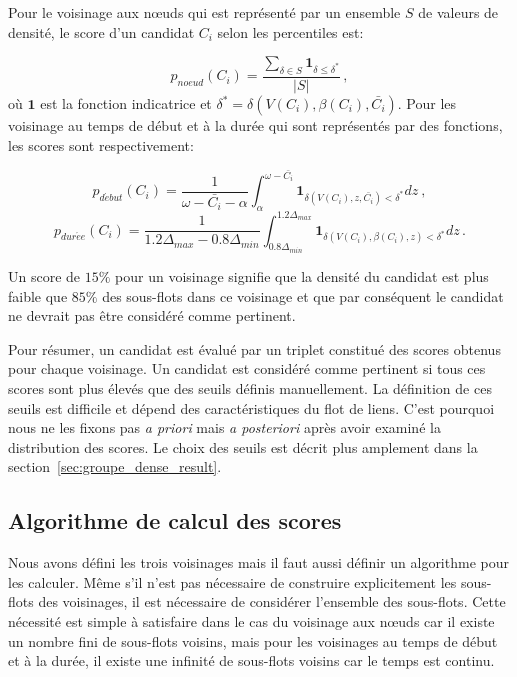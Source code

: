 Pour le voisinage aux n\oe{}uds qui est représenté par un ensemble $S$ de valeurs de densité, le score d'un candidat $C_i$ selon les percentiles est:

\begin{equation}
p_{noeud}(C_i)= \dfrac{\sum_{\delta \in S} \mathbf{1}_{\delta \le \delta^*}}{|S|}\,,
\end{equation}
où $\mathbf{1}$ est la fonction indicatrice et $\delta^* =\delta(V(C_i),\beta(C_i), \bar{C_i})$.
Pour les voisinage au temps de début et à la durée qui sont représentés par des fonctions, les scores sont respectivement:

\begin{equation}
p_{d\acute{e}but}(C_i)=\dfrac{1}{\omega-\bar{C_i} - \alpha} \int_{\alpha}^{\omega- \bar{C_i}} \mathbf{1}_{\delta(V(C_i),z,\bar{C_i}) <\delta^*} dz \ ,
\end{equation} 
\begin{equation}
p_{dur\acute{e}e}(C_i)=\dfrac{1}{1.2\Delta_{max} - 0.8\Delta_{min}} \int_{0.8\Delta_{min}}^{1.2\Delta_{max}} \mathbf{1}_{\delta(V(C_i),\beta(C_i),z) <\delta^*} dz \, .
\end{equation}

Un score de $15\%$ pour un voisinage signifie que la densité du candidat est plus faible que $85\%$ des sous-flots dans ce voisinage et que par conséquent le candidat ne devrait pas être considéré comme pertinent.

\bigskip
Pour résumer, un candidat est évalué par un triplet constitué des scores obtenus pour chaque voisinage.
Un candidat est considéré comme pertinent si tous ces scores sont plus élevés que des seuils définis manuellement.
La définition de ces seuils est difficile et dépend des caractéristiques du flot de liens.
C'est pourquoi nous ne les fixons pas \emph{a priori} mais \emph{a posteriori} après avoir examiné la distribution des scores.
Le choix des seuils est décrit plus amplement dans la section~\ref{sec:groupe_dense_result}.

\subsection{Algorithme de calcul des scores}
Nous avons défini les trois voisinages mais il faut aussi définir un algorithme pour les calculer.
Même s'il n'est pas nécessaire de construire explicitement les sous-flots des voisinages, il est nécessaire de considérer l'ensemble des sous-flots.
Cette nécessité est simple à satisfaire dans le cas du voisinage aux n\oe{}uds car il existe un nombre fini de sous-flots voisins, mais pour les voisinages au temps de début et à la durée, il existe une infinité de sous-flots voisins car le temps est continu.


